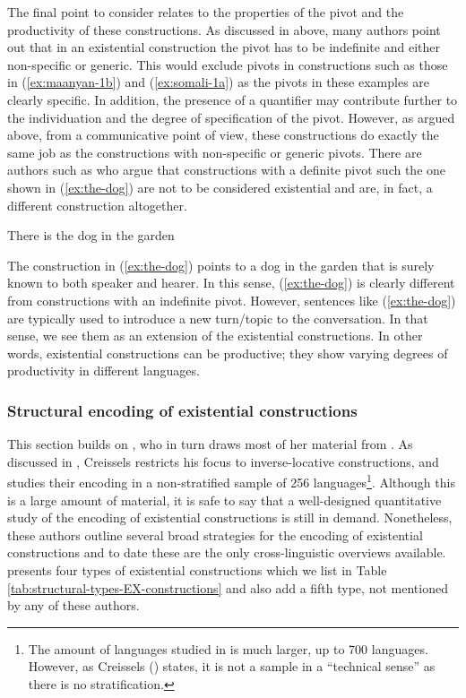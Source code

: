 \documentclass[output=paper,chinesefont,colorlinks,citecolor=brown]{langscibook}
\begin{document}
The final point to consider relates to the properties of the pivot and the productivity of these constructions. As discussed in  above, many authors point out that in an existential construction the pivot has to be indefinite and either non-specific or generic. This would exclude pivots in constructions such as those in (\ref{ex:maanyan-1b}) and (\ref{ex:somali-1a}) as the pivots in these examples are clearly specific. In addition, the presence of a quantifier may contribute further to the individuation and the degree of specification of the pivot. However, as argued above, from a communicative point of view, these constructions do exactly the same job as the constructions with non-specific or generic pivots. There are authors such as \citet[242]{dryer2007a} who argue that constructions with a definite pivot such the one shown in (\ref{ex:the-dog})
are not to be considered existential and are, in fact, a different construction altogether.

\begin{exe}
\ex \label{ex:the-dog}
There is the dog in the garden
\end{exe}
The construction in (\ref{ex:the-dog}) points to a dog in the garden that is surely known to both speaker and hearer. In this sense, (\ref{ex:the-dog}) is clearly different from constructions with an indefinite pivot. However, sentences like (\ref{ex:the-dog}) are typically used to introduce a new turn\slash topic to the conversation. In that sense, we see them as an extension of the existential constructions. In other words, existential constructions can be productive; they show varying degrees of productivity in different languages.

\subsubsection{Structural encoding of existential constructions}\label{sect:existentials-structure}\label{sec:intro:2.2.4}
This section builds on \citet{McNally2016}, who in turn draws most of her material from \citet{Creissels2014}. As discussed in , Creissels restricts his focus to inverse-locative constructions, and studies their encoding in a non-stratified sample of 256 languages\footnote{The amount of languages studied in \citet{creissels2019} is much larger, up to 700 languages. However, as Creissels (\citeyear[39]{creissels2019}) states, it is not a sample in a “technical sense” as there is no stratification.}. Although this is a large amount of material, it is safe to say that a well-designed quantitative study of the encoding of existential constructions is still in demand. Nonetheless, these authors outline several broad strategies for the encoding of existential constructions and to date these are the only cross-linguistic overviews available. \citet{McNally2016} presents four types of existential constructions which we list in Table \ref{tab:structural-types-EX-constructions} and also add a fifth type, not mentioned by any of these authors.
\end{document}

